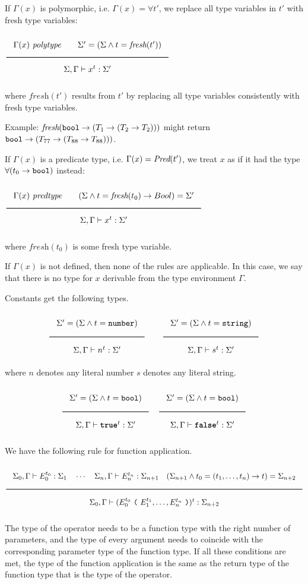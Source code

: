 If $\Gamma(x)$ is polymorphic,  i.e. $\Gamma(x) = \forall t'$, we replace all type variables in
$t'$ with fresh type variables:

\noindent
$\Rule{\Gamma(x)\ \polytype \qquad
  \Sigma' = (\Sigma \wedge t = \textit{fresh}(t'))}{\Sigma, \Gamma \vdash x^t : \Sigma'}$

\noindent
where $\textit{fresh}(t')$ results from $t'$ by replacing all type variables consistently with
fresh type variables.

Example: $\textit{fresh}(\texttt{bool} \rightarrow (T_1 \rightarrow (T_2 \rightarrow T_2)))$
might return $\texttt{bool} \rightarrow (T_{77} \rightarrow (T_{88} \rightarrow T_{88})))$.

If $\Gamma(x)$ is a predicate type,  i.e. $\Gamma(x) = \textit{Pred}(t')$,
we treat $x$ as if it had the type $\forall (t_0 \rightarrow \texttt{bool})$ instead:

\noindent
$\Rule{\Gamma(x)\ \predtype \qquad
  (\Sigma \wedge t = \textit{fresh}(t_0) \rightarrow Bool) = \Sigma'}{\Sigma, \Gamma \vdash x^t : \Sigma'}$

\noindent
where $\textit{fresh}(t_0)$ is some fresh type variable.

If $\Gamma(x)$ is not defined, then none of the rules are applicable.
In this case, we say that
there is no type for $x$ derivable from the type environment $\Gamma$. 

Constants get the following types.

\noindent
\[
  \Rule{\Sigma' = (\Sigma \wedge t = \Number)}{\Sigma, \Gamma \vdash n^t : \Sigma'}
  \qquad
  \Rule{\Sigma' = (\Sigma \wedge t = \String)}{\Sigma, \Gamma \vdash s^t : \Sigma'}
\]
\noindent
where $n$ denotes any literal number $s$ denotes any literal string.

\noindent
\[
  \Rule{\Sigma' = (\Sigma \wedge t = \Bool)}{\Sigma, \Gamma \vdash \TruE^t : \Sigma'}
  \quad
  \Rule{\Sigma' = (\Sigma \wedge t = \Bool)}{\Sigma, \Gamma \vdash \FalsE^t : \Sigma'}  
\]

We have the following rule for function application.

\[
\Rule{  \Sigma_0, \Gamma \vdash E_0^{t_0} : \Sigma_1 \quad
  \cdots \quad \Sigma_{n}, \Gamma \vdash E_{n}^{t_n} : \Sigma_{n+1} \quad
  (\Sigma_{n+1} \wedge t_0 = (t_1, \ldots, t_n) \rightarrow t) = \Sigma_{n+2}}{
  \Sigma_0, \Gamma \vdash (E_0^{t_0}\ \Lp \ E_1^{t_1}, \ldots, E_n^{t_n}\ \Rp)^t : \Sigma_{n+2}}  
\]

\noindent
The type of the operator needs to be a function type with the right
number of parameters, and the type of every argument needs to coincide
with the corresponding parameter type of the function type. If all these
conditions are met, the type of the function application is the same
as the return type of the function type that is the type of the operator.

